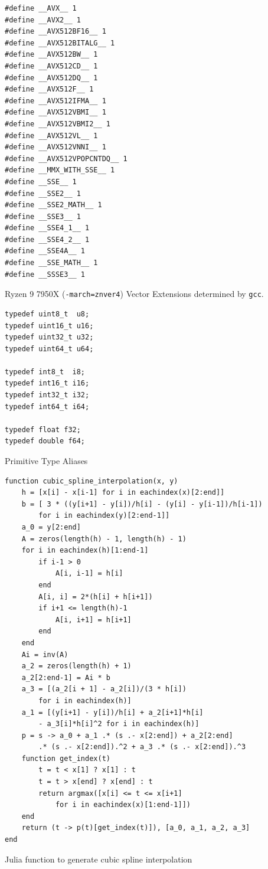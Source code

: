 \documentclass[a4paper, 11pt]{memoir}
\begin{document}
    \begin{listing}[ht]
        \begin{verbatim}
#define __AVX__ 1
#define __AVX2__ 1
#define __AVX512BF16__ 1
#define __AVX512BITALG__ 1
#define __AVX512BW__ 1
#define __AVX512CD__ 1
#define __AVX512DQ__ 1
#define __AVX512F__ 1
#define __AVX512IFMA__ 1
#define __AVX512VBMI__ 1
#define __AVX512VBMI2__ 1
#define __AVX512VL__ 1
#define __AVX512VNNI__ 1
#define __AVX512VPOPCNTDQ__ 1
#define __MMX_WITH_SSE__ 1
#define __SSE__ 1
#define __SSE2__ 1
#define __SSE2_MATH__ 1
#define __SSE3__ 1
#define __SSE4_1__ 1
#define __SSE4_2__ 1
#define __SSE4A__ 1
#define __SSE_MATH__ 1
#define __SSSE3__ 1
        \end{verbatim}
        \caption{Ryzen 9 7950X (\texttt{-march=znver4}) Vector Extensions determined by \texttt{gcc}.}
        \label{lst:extensions}
    \end{listing}

    \begin{listing}[ht]
        \begin{verbatim}
typedef uint8_t  u8;
typedef uint16_t u16;
typedef uint32_t u32;
typedef uint64_t u64;

typedef int8_t  i8;
typedef int16_t i16;
typedef int32_t i32;
typedef int64_t i64;

typedef float f32;
typedef double f64;
        \end{verbatim}
        \caption{Primitive Type Aliases}
        \label{lst:type_aliases}
    \end{listing}

    \begin{listing}[ht]
        \begin{verbatim}
function cubic_spline_interpolation(x, y)
    h = [x[i] - x[i-1] for i in eachindex(x)[2:end]]
    b = [ 3 * ((y[i+1] - y[i])/h[i] - (y[i] - y[i-1])/h[i-1])
        for i in eachindex(y)[2:end-1]]
    a_0 = y[2:end]
    A = zeros(length(h) - 1, length(h) - 1)
    for i in eachindex(h)[1:end-1]
        if i-1 > 0
            A[i, i-1] = h[i]
        end
        A[i, i] = 2*(h[i] + h[i+1])
        if i+1 <= length(h)-1
            A[i, i+1] = h[i+1]
        end
    end
    Ai = inv(A)
    a_2 = zeros(length(h) + 1)
    a_2[2:end-1] = Ai * b
    a_3 = [(a_2[i + 1] - a_2[i])/(3 * h[i])
        for i in eachindex(h)]
    a_1 = [(y[i+1] - y[i])/h[i] + a_2[i+1]*h[i]
        - a_3[i]*h[i]^2 for i in eachindex(h)]
    p = s -> a_0 + a_1 .* (s .- x[2:end]) + a_2[2:end]
        .* (s .- x[2:end]).^2 + a_3 .* (s .- x[2:end]).^3
    function get_index(t)
        t = t < x[1] ? x[1] : t
        t = t > x[end] ? x[end] : t
        return argmax([x[i] <= t <= x[i+1]
            for i in eachindex(x)[1:end-1]])
    end
    return (t -> p(t)[get_index(t)]), [a_0, a_1, a_2, a_3]
end
        \end{verbatim}
        \caption{Julia function to generate cubic spline interpolation}
        \label{lst:jl_cubic_spline}
    \end{listing}
\end{document}

